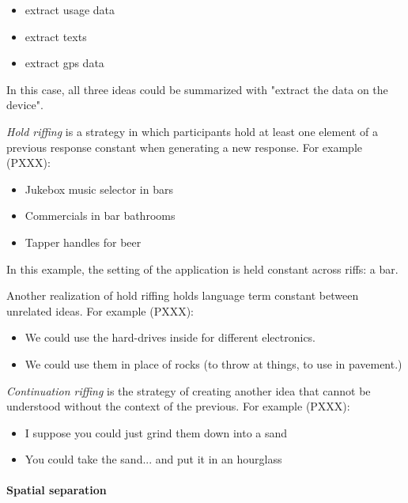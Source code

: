 \begin{itemize}
    \item extract usage data
    \item extract texts
    \item extract gps data
\end{itemize}

In this case, all three ideas could be summarized with "extract the data on the device".

\emph{Hold riffing} is a strategy in which participants hold at least one element of a previous response constant when generating a new response. For example (PXXX):

\begin{itemize}
    \item Jukebox music selector in bars
    \item Commercials in bar bathrooms 
    \item Tapper handles for beer 
\end{itemize}

In this example, the setting of the application is held constant across riffs: a bar.

Another realization of hold riffing holds language term constant between unrelated ideas. For example (PXXX):

\begin{itemize}
    \item We could use the hard-drives inside for different electronics.
    \item We could use them in place of rocks (to throw at things, to use in pavement.)
\end{itemize}

\emph{Continuation riffing} is the strategy of creating another idea that cannot be understood without the context of the previous. For example (PXXX):

\begin{itemize}
    \item I suppose you could just grind them down into a sand
    \item You could take the sand... and put it in an hourglass
\end{itemize}

\paragraph{Spatial separation}


